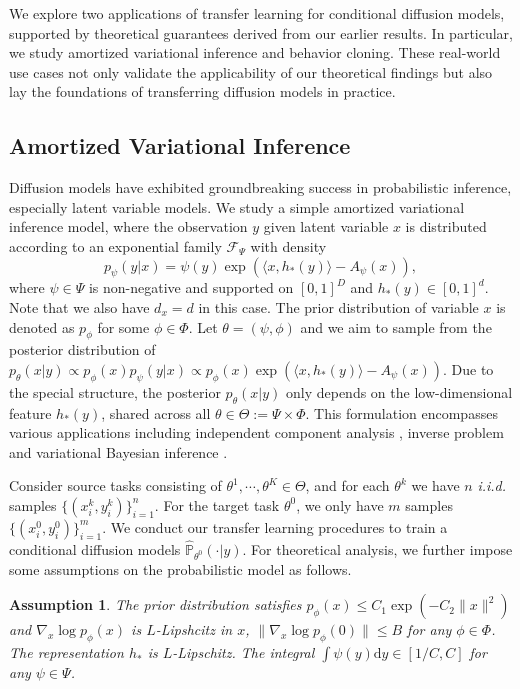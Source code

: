 \documentclass{article}
\numberwithin{equation}{section}
\newcommand{\dif}{\mathrm{d}}
\newtheorem{asp}{Assumption}[section]
\theoremstyle{definition}
\renewcommand{\P}{\mathbb{P}}
\begin{document}
We explore two applications of transfer learning for conditional diffusion models, supported by theoretical guarantees derived from our earlier results.
In particular, we study amortized variational inference and behavior cloning.
These real-world use cases not only validate the applicability of our theoretical findings but also lay the foundations of transferring diffusion models in practice.


\subsection{Amortized Variational Inference}

Diffusion models have exhibited groundbreaking success in probabilistic inference, especially latent variable models.
We study a simple amortized variational inference model, where the observation $y$ given latent variable $x$ is distributed according to an exponential family $\mathcal{F}_\Psi$ with density
\begin{equation}
    p_\psi(y|x)=\psi(y)\exp(\langle x, h_*(y)\rangle-A_\psi(x)),
\end{equation}
where $\psi\in\Psi$ is non-negative and supported on $[0,1]^{D}$ and $h_*(y)\in[0,1]^{d}$. 
Note that we also have $d_x=d$ in this case.
The prior distribution of variable $x$ is denoted as $p_\phi$ for some $\phi\in\Phi$. 
Let $\theta=(\psi,\phi)$ and we aim to sample from the posterior distribution of $p_\theta(x|y)\propto p_\phi(x)p_\psi(y|x)\propto p_\phi(x)\exp(\langle x, h_*(y)\rangle-A_\psi(x))$.
Due to the special structure, the posterior $p_\theta(x|y)$ only depends on the low-dimensional feature $h_*(y)$, shared across all $\theta\in\Theta:=\Psi\times\Phi$.
This formulation encompasses various applications including independent component analysis \citep{comon1994independent}, inverse problem \citep{song2021solving,ajay2022conditional} and variational Bayesian inference \citep{kingma2013auto}. 

Consider source tasks consisting of $\theta^1,\cdots,\theta^K\in\Theta$, and for each $\theta^k$ we have $n$ \textit{i.i.d.} samples $\{(x_i^k,y_i^k)\}_{i=1}^n$.
For the target task $\theta^0$, we only have $m$ samples $\{(x_i^0,y_i^0)\}_{i=1}^m$.
We conduct our transfer learning procedures to train a conditional diffusion models $\widehat{\P}_{\theta^0}(\cdot|y)$.
For theoretical analysis, we further impose some assumptions on the probabilistic model as follows.
\begin{asp}\label{asp:amortized_vi}
    The prior distribution satisfies $p_\phi(x)\leq C_1\exp(-C_2\|x\|^2)$ and $\nabla_x \log p_\phi(x)$ is $L$-Lipshcitz in $x$, $\|\nabla_x \log p_\phi(0)\|\leq B$ for any $\phi\in\Phi$.
    The representation $h_*$ is $L$-Lipschitz.
    The integral $\int \psi(y)\dif y\in [1/C, C]$ for any $\psi\in\Psi$.
\end{asp}
\end{document}
